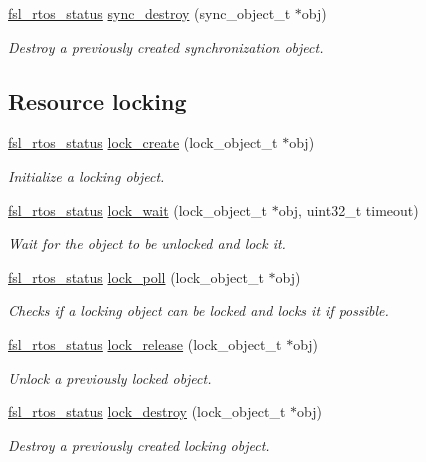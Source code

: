 \begin{DoxyCompactItemize}
\hyperlink{group__os__abstraction_gaea1a100f413fd124de281c4b493e99d5}{fsl\+\_\+rtos\+\_\+status} \hyperlink{group__os__abstraction_ga23c9bea6ba99937cc2f06bf8333b6f14}{sync\+\_\+destroy} (sync\+\_\+object\+\_\+t $\ast$obj)
\begin{DoxyCompactList}\small\item\em Destroy a previously created synchronization object. \end{DoxyCompactList}\end{DoxyCompactItemize}
\subsection*{Resource locking}
\begin{DoxyCompactItemize}
\item 
\hyperlink{group__os__abstraction_gaea1a100f413fd124de281c4b493e99d5}{fsl\+\_\+rtos\+\_\+status} \hyperlink{group__os__abstraction_ga65e4e4b0ef39d139316f2b6717cd7549}{lock\+\_\+create} (lock\+\_\+object\+\_\+t $\ast$obj)
\begin{DoxyCompactList}\small\item\em Initialize a locking object. \end{DoxyCompactList}\item 
\hyperlink{group__os__abstraction_gaea1a100f413fd124de281c4b493e99d5}{fsl\+\_\+rtos\+\_\+status} \hyperlink{group__os__abstraction_ga053ad8b32a859637012c1bababb6320c}{lock\+\_\+wait} (lock\+\_\+object\+\_\+t $\ast$obj, uint32\+\_\+t timeout)
\begin{DoxyCompactList}\small\item\em Wait for the object to be unlocked and lock it. \end{DoxyCompactList}\item 
\hyperlink{group__os__abstraction_gaea1a100f413fd124de281c4b493e99d5}{fsl\+\_\+rtos\+\_\+status} \hyperlink{group__os__abstraction_gad3646647e043e13bc9c71437f2ad7539}{lock\+\_\+poll} (lock\+\_\+object\+\_\+t $\ast$obj)
\begin{DoxyCompactList}\small\item\em Checks if a locking object can be locked and locks it if possible. \end{DoxyCompactList}\item 
\hyperlink{group__os__abstraction_gaea1a100f413fd124de281c4b493e99d5}{fsl\+\_\+rtos\+\_\+status} \hyperlink{group__os__abstraction_ga9a237a18d865d1c81ca93370ab5b2676}{lock\+\_\+release} (lock\+\_\+object\+\_\+t $\ast$obj)
\begin{DoxyCompactList}\small\item\em Unlock a previously locked object. \end{DoxyCompactList}\item 
\hyperlink{group__os__abstraction_gaea1a100f413fd124de281c4b493e99d5}{fsl\+\_\+rtos\+\_\+status} \hyperlink{group__os__abstraction_ga4e638dfc2ae4413dd27b1103513f4e8e}{lock\+\_\+destroy} (lock\+\_\+object\+\_\+t $\ast$obj)
\begin{DoxyCompactList}\small\item\em Destroy a previously created locking object. \end{DoxyCompactList}\end{DoxyCompactItemize}
